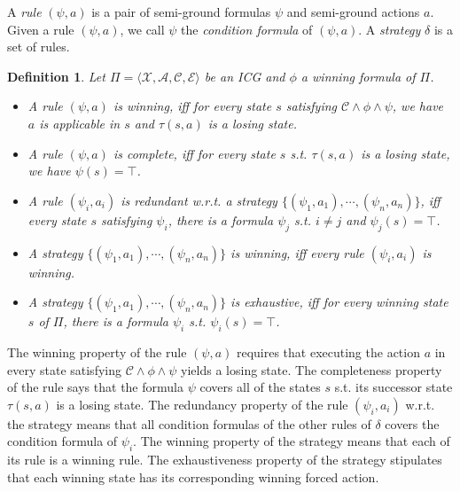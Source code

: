 \documentclass[review]{elsarticle}
\newcommand{\set}[1]{\{ #1 \}}
\newcommand{\tuple}[1]{\langle {#1} \rangle}
\newcommand{\true}{\top}
\newcommand{\statevar}{\mathcal{X}}
\newcommand{\act}{\mathcal{A}}
\newcommand{\constraint}{\mathcal{C}}
\newcommand{\estate}{\mathcal{E}}
\newcommand{\suc}{\tau}
\newtheorem{definition}{Definition}
\begin{document}
	A \textit{rule} $(\psi, a)$ is a pair of semi-ground formulas $\psi$ and semi-ground actions $a$.
	Given a rule $(\psi, a)$, we call $\psi$ the \textit{condition formula} of $(\psi, a)$.
	A \textit{strategy} $\delta$ is a set of rules.
	\begin{definition} \label{def:winRule} \rm
		Let $\Pi = \tuple{\statevar, \act, \constraint, \estate}$ be an ICG and $\phi$ a winning formula of $\Pi$.
		\begin{itemize}
			\item A rule $(\psi, a)$ is \textit{winning}, iff for every state $s$ satisfying $\constraint \land \phi \land \psi$, we have $a$ is applicable in $s$ and $\suc(s, a)$ is a losing state.
			
			\item A rule $(\psi, a)$ is \textit{complete}, iff for every state $s$ s.t. $\suc(s, a)$ is a losing state, we have $\psi(s) = \true$.
			
			\item A rule $(\psi_i, a_i)$ is \textit{redundant} w.r.t. a strategy $\set{(\psi_1, a_1), \cdots, (\psi_n, a_n)}$, iff every state $s$ satisfying $\psi_i$, there is a formula $\psi_j$ s.t. $i \neq j$ and $\psi_j(s) = \true$.
			
			\item A strategy $\set{(\psi_1, a_1), \cdots, (\psi_n, a_n)}$ is \textit{winning}, iff every rule $(\psi_i, a_i)$ is winning.
			
			\item A strategy $\set{(\psi_1, a_1), \cdots, (\psi_n, a_n)}$ is \textit{exhaustive}, iff for every winning state $s$ of $\Pi$, there is a formula $\psi_i$ s.t. $\psi_i(s) = \true$.			
		\end{itemize}
	\end{definition}
	
	The winning property of the rule $(\psi, a)$ requires that executing the action $a$ in every state satisfying $\constraint \land \phi \land \psi$ yields a losing state.
	The completeness property of the rule says that the formula $\psi$ covers all of the states $s$ s.t. its successor state $\suc(s, a)$ is a losing state.	
	The redundancy property of the rule $(\psi_i, a_i)$ w.r.t. the strategy means that all condition formulas of the other rules of $\delta$ covers the condition formula of $\psi_i$.
	The winning property of the strategy means that each of its rule is a winning rule.
	The exhaustiveness property of the strategy stipulates that each winning state has its corresponding winning forced action.
	
\end{document}
